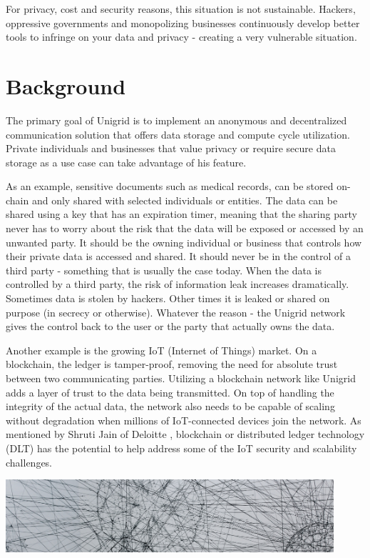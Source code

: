 \documentclass{article}
\begin{document}
For privacy, cost and security reasons, this situation is not sustainable. Hackers, oppressive governments and monopolizing businesses continuously develop better tools to infringe on your data and privacy - creating a very vulnerable situation.

\section{Background}
The primary goal of Unigrid is to implement an anonymous and decentralized communication solution that offers data storage and compute cycle utilization. Private individuals and businesses that value privacy or require secure data storage as a use case can take advantage of his feature.

As an example, sensitive documents such as medical records, can be stored on-chain and only shared with selected individuals or entities. The data can be shared using a key that has an expiration timer, meaning that the sharing party never has to worry about the risk that the data will be exposed or accessed by an unwanted party. It should be the owning individual or business that controls how their private data is accessed and shared. It should never be in the control of a third party - something that is usually the case today. When the data is controlled by a third party, the risk of information leak increases dramatically. Sometimes data is stolen by hackers. Other times it is leaked or shared on purpose (in secrecy or otherwise). Whatever the reason - the Unigrid network gives the control back to the user or the party that actually owns the data.

Another example is the growing IoT (Internet of Things) market. On a blockchain, the ledger is tamper-proof, removing the need for absolute trust between two communicating parties. Utilizing a blockchain network like Unigrid adds a layer of trust to the data being transmitted. On top of handling the integrity of the actual data, the network also needs to be capable of scaling without degradation when millions of IoT-connected devices join the network. As mentioned by Shruti Jain of Deloitte \cite{jain2021}, blockchain or distributed ledger technology (DLT) has the potential to help address some of the IoT security and scalability challenges.
\begin{mdframed}[style=textimage]
	\includegraphics[width=345pt]{communication} 
\end{mdframed}
\end{document}
